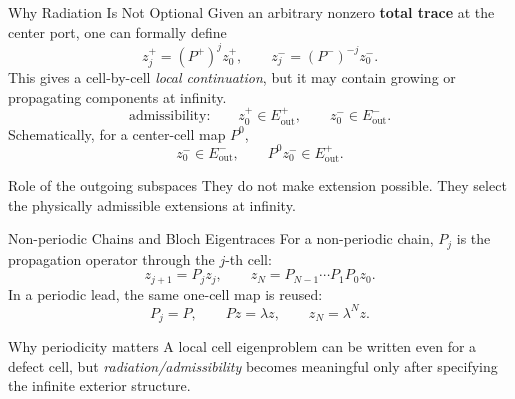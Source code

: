 \documentclass[aspectratio=169]{beamer}
\begin{document}
\begin{frame}{Why Radiation Is Not Optional}
  Given an arbitrary nonzero \textbf{total trace} at the center port, one can
  formally define
  \[
    z_j^+=(P^+)^jz_0^+,
    \qquad
    z_j^-=(P^-)^{-j}z_0^-.
  \]
  This gives a cell-by-cell \emph{local continuation}, but it may contain growing
  or propagating components at infinity.
  \[
    \text{admissibility:}\qquad
    z_0^+\in E_{\mathrm{out}}^+,
    \qquad
    z_0^-\in E_{\mathrm{out}}^-.
  \]
  Schematically, for a center-cell map \(P^0\),
  \[
    z_0^-\in E_{\mathrm{out}}^-,
    \qquad
    P^0z_0^-\in E_{\mathrm{out}}^+.
  \]
  \begin{alertblock}{Role of the outgoing subspaces}
    They do not make extension possible.  They select the physically
    admissible extensions at infinity.
  \end{alertblock}
\end{frame}

\begin{frame}{Non-periodic Chains and Bloch Eigentraces}
  For a non-periodic chain, \(P_j\) is the propagation operator through the
  \(j\)-th cell:
  \[
    z_{j+1}=P_jz_j,
    \qquad
    z_N=P_{N-1}\cdots P_1P_0z_0.
  \]
  In a periodic lead, the same one-cell map is reused:
  \[
    P_j=P,
    \qquad
    Pz=\lambda z,
    \qquad
    z_N=\lambda^Nz.
  \]
  \begin{block}{Why periodicity matters}
    A local cell eigenproblem can be written even for a defect cell, but
    \emph{radiation/admissibility} becomes meaningful only after specifying the
    infinite exterior structure.
  \end{block}
\end{frame}
\end{document}
